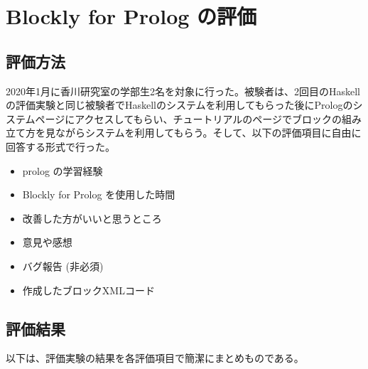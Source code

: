 \documentclass{risepaper}
\begin{document}
   \section{Blockly for Prolog の評価}
   
		\subsection{評価方法}

2020年1月に香川研究室の学部生2名を対象に行った。被験者は、2回目のHaskellの評価実験と同じ被験者でHaskellのシステムを利用してもらった後にPrologのシステムページにアクセスしてもらい、チュートリアルのページでブロックの組み立て方を見ながらシステムを利用してもらう。そして、以下の評価項目に自由に回答する形式で行った。

\begin{itemize}
\item prolog の学習経験
\item Blockly for Prolog を使用した時間
\item 改善した方がいいと思うところ
\item 意見や感想
\item バグ報告 (非必須)
\item 作成したブロックXMLコード
\end{itemize} 

		\subsection{評価結果}

以下は、評価実験の結果を各評価項目で簡潔にまとめものである。
\end{document}
